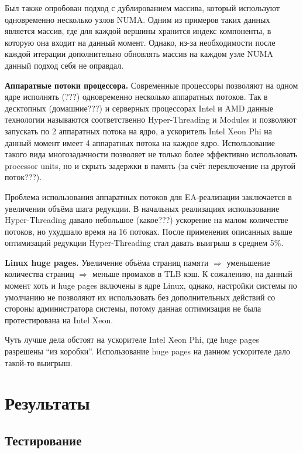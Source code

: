 \documentclass{article}
\begin{document}
Был также опробован подход с дублированием массива, который используют одновременно несколько узлов NUMA. Одним из примеров таких данных является массив, где для каждой вершины хранится индекс компоненты, в которую она входит на данный момент. Однако, из-за необходимости после каждой итерации дополнительно обновлять массив на каждом узле NUMA данный подход себя не оправдал.



\textbf{Аппаратные потоки процессора.}
Современные процессоры позволяют на одном ядре исполнять (???) одновременно несколько аппаратных потоков. Так в десктопных (домашние???) и серверных процессорах Intel и AMD данные технологии называются соответственно Hyper-Threading и Modules и позволяют запускать по 2 аппаратных потока на ядро, а ускоритель Intel Xeon Phi на данный момент имеет 4 аппаратных потока на каждое ядро. Использование такого вида многозадачности позволяет не только более эффективно использовать processor units, но и скрыть задержки в память (за счёт переключение на другой поток???).

Проблема использования аппаратных потоков для EA-реализации заключается в увеличении объёма шага редукции. В начальных реализациях использование Hyper-Threading давало небольшое (какое???) ускорение на малом количестве потоков, но ухудшало время на 16 потоках. После применения описанных выше оптимизаций редукции Hyper-Threading стал давать выигрыш в среднем 5\%.



\textbf{Linux huge pages.}
Увеличение объёма страниц памяти $\Rightarrow$ уменьшение количества страниц $\Rightarrow$ меньше промахов в TLB кэш.
К сожалению, на данный момент хоть и huge pages включены в ядре Linux, однако, настройки системы по умолчанию не позволяют их использовать без дополнительных действий со стороны администратора системы, потому данная оптимизация не была протестирована на Intel Xeon.

Чуть лучше дела обстоят на ускорителе Intel Xeon Phi, где huge pages разрешены ``из коробки''. Использование huge pages на данном ускорителе дало такой-то выигрыш.


\newpage
\section{Результаты}

\subsection{Тестирование}
\end{document}
